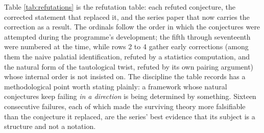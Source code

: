 \documentclass[11pt]{article}
\theoremstyle{definition}
\begin{document}
Table \ref{tab:refutations} is the refutation table: each refuted conjecture, the corrected statement that replaced it, and the series paper that now carries the correction as a result. The ordinals follow the order in which the conjectures were attempted during the programme's development; the fifth through seventeenth were numbered at the time, while rows 2 to 4 gather early corrections (among them the naive palatial identification, refuted by a statistics computation, and the natural form of the tautological twist, refuted by its own pairing argument) whose internal order is not insisted on. The discipline the table records has a methodological point worth stating plainly: a framework whose natural conjectures keep failing \emph{in a direction} is being determined by something. Sixteen consecutive failures, each of which made the surviving theory more falsifiable than the conjecture it replaced, are the series' best evidence that its subject is a structure and not a notation.
\end{document}
